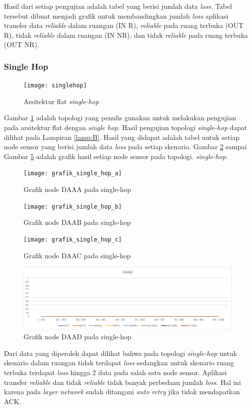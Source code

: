 Hasil dari setiap pengujian adalah tabel yang berisi jumlah data \textit{loss}. Tabel tersebut dibuat menjadi grafik untuk membandingkan jumlah \textit{loss} aplikasi transfer data \textit{reliable} dalam ruangan (IN R), \textit{reliable} pada ruang terbuka (OUT R), tidak \textit{reliable} dalam ruangan (IN NR), dan tidak \textit{reliable} pada ruang terbuka (OUT NR). 

\subsubsection{Single Hop}
\begin{figure}[H]
	\centering
	\texttt{[image: singlehop]}
	\caption{Arsitektur flat \textit{single-hop}}
	\label{fig:singlehop}
\end{figure}
Gambar \ref{fig:singlehop} adalah topologi yang penulis gunakan untuk melakukan pengujian pada arsitektur flat dengan \textit{single hop}. 
Hasil pengujian topologi \textit{single-hop} dapat dilihat pada Lampiran \ref{lamp:B}. Hasil yang didapat adalah tabel untuk setiap node sensor yang berisi jumlah data \textit{loss} pada setiap skenario. Gambar \ref{fig:grafik_single_hop_a} sampai Gambar \ref{fig:grafik_single_hop_d} adalah grafik hasil setiap node sensor pada topologi. \textit{single-hop}.
\begin{figure}[H]
	\centering
	\texttt{[image: grafik\_single\_hop\_a]}
	\caption{Grafik node DAAA pada single-hop}
	\label{fig:grafik_single_hop_a}
\end{figure}
\begin{figure}[H]
	\centering
	\texttt{[image: grafik\_single\_hop\_b]}
	\caption{Grafik node DAAB pada single-hop}
	\label{fig:grafik_single_hop_b}
\end{figure}
\begin{figure}[H]
	\centering
	\texttt{[image: grafik\_single\_hop\_c]}
	\caption{Grafik node DAAC pada single-hop}
	\label{fig:grafik_single_hop_c}
\end{figure}
\begin{figure}[H]
	\centering
	\includegraphics[scale=0.45]{grafik_single_hop_d}
	\caption{Grafik node DAAD pada single-hop}
	\label{fig:grafik_single_hop_d}
\end{figure}
Dari data yang diperoleh dapat dilihat bahwa pada topologi \textit{single-hop} untuk skenario dalam ruangan tidak terdapat \textit{loss} sedangkan untuk skenario ruang terbuka terdapat \textit{loss} hingga 2 data pada salah satu node sensor. Aplikasi transfer \textit{reliable} dan tidak \textit{reliable} tidak banyak perbedaan jumlah \textit{loss}. Hal ini karena pada \textit{layer network} sudah ditangani \textit{auto retry} jika tidak mendapatkan ACK.

